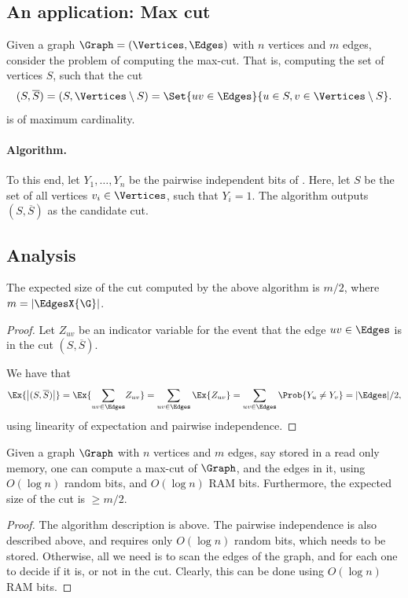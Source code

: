 \subsection{An application: Max cut}

Given a graph $\Graph = (\Vertices, \Edges)$ with $n$ vertices and $m$
edges, consider the problem of computing the max-cut. That is,
computing the set of vertices $S$, such that the cut
\begin{equation*}
    (S, \overline{S})%
    =%
    (S, \Vertices\setminus S) =%
    \Set{uv \in \Edges}{ u \in S, v \in \Vertices \setminus S}.    
\end{equation*}
is of maximum cardinality.

\paragraph{Algorithm.}
To this end, let $Y_1, \ldots, Y_n$ be the pairwise independent bits
of . Here, let $S$ be the set of all vertices
$v_i \in \Vertices$, such that $Y_i= 1$. The algorithm outputs $(S,
\overline{S})$ as the candidate cut.

\subsection{Analysis}

\begin{lemma}
    The expected size of the cut computed by the above algorithm is
    $m/2$, where $m = |\EdgesX{\G}|$.
\end{lemma}
\begin{proof}
    Let $Z_{uv}$ be an indicator variable for the event that the edge
    $uv \in \Edges$ is in the cut $(S,\overline{S})$.

    We have that
    \begin{equation*}
        \Ex{ \bigl|  ( S, \overline{S} ) \bigr| } %
        =%
        \Ex{\Bigl. \smash{\sum_{uv \in\Edges}} Z_{uv}}%
        =%
        \sum_{uv \in\Edges} \Ex{Z_{uv}}%
        =%
        \sum_{uv \in\Edges} \Prob{Y_u \neq Y_v}%
        =%
        |\Edges|/2,
    \end{equation*}
    using linearity of expectation and pairwise independence.
\end{proof}

\begin{lemma}
    Given a graph $\Graph$ with $n$ vertices and $m$ edges, say stored
    in a read only memory, one can compute a max-cut of $\Graph$, and
    the edges in it, using $O( \log n)$ random bits, and $O(\log n)$
    RAM bits. Furthermore, the expected size of the cut is $\geq m/2$.
\end{lemma}
\begin{proof}
    The algorithm description is above. The pairwise independence is
    also described above, and requires only $O( \log n)$ random bits,
    which needs to be stored. Otherwise, all we need is to scan the
    edges of the graph, and for each one to decide if it is, or not in
    the cut. Clearly, this can be done using $O( \log n)$ RAM bits.
\end{proof}

